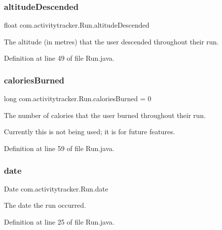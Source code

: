 \subsubsection{\texorpdfstring{altitude\+Descended}{altitudeDescended}}
{\footnotesize\ttfamily float com.\+activitytracker.\+Run.\+altitude\+Descended\hspace{0.3cm}{\ttfamily [package]}}

The altitude (in metres) that the user descended throughout their run. 

Definition at line 49 of file Run.\+java.

\mbox{\label{classcom_1_1activitytracker_1_1_run_aa4c73467653a47d3b14ff6653bbab853}} 
\subsubsection{\texorpdfstring{calories\+Burned}{caloriesBurned}}
{\footnotesize\ttfamily long com.\+activitytracker.\+Run.\+calories\+Burned = 0\hspace{0.3cm}{\ttfamily [package]}}

The number of calories that the user burned throughout their run.

Currently this is not being used; it is for future features. 

Definition at line 59 of file Run.\+java.

\mbox{\label{classcom_1_1activitytracker_1_1_run_a66934b1f4fe6bc74a4e98574a2892764}} 
\subsubsection{\texorpdfstring{date}{date}}
{\footnotesize\ttfamily Date com.\+activitytracker.\+Run.\+date\hspace{0.3cm}{\ttfamily [package]}}

The date the run occurred. 

Definition at line 25 of file Run.\+java.

